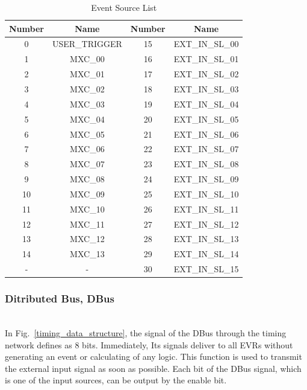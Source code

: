 \documentclass[journal]{IEEEtran}
\begin{document}
\begin{table}[h!t]
	\centering
	\caption{Event Source List}
	\label{event_tri_list}
	
	\begin{tabular}{@{}c|c|c|c@{}}
		\hline
		\textbf{Number}	& \textbf{Name}			& \textbf{Number}		& \textbf{Name}\\
		\hline
		0				& USER\_TRIGGER			& 15					& EXT\_IN\_SL\_00\\
		1				& MXC\_00				& 16					& EXT\_IN\_SL\_01\\
		2				& MXC\_01				& 17					& EXT\_IN\_SL\_02\\
		3				& MXC\_02				& 18					& EXT\_IN\_SL\_03\\
		4				& MXC\_03				& 19					& EXT\_IN\_SL\_04\\
		5				& MXC\_04				& 20					& EXT\_IN\_SL\_05\\
		6				& MXC\_05				& 21					& EXT\_IN\_SL\_06\\
		7				& MXC\_06				& 22					& EXT\_IN\_SL\_07\\
		8				& MXC\_07				& 23					& EXT\_IN\_SL\_08\\
		9				& MXC\_08				& 24					& EXT\_IN\_SL\_09\\
		10				& MXC\_09				& 25					& EXT\_IN\_SL\_10\\
		11				& MXC\_10				& 26					& EXT\_IN\_SL\_11\\
		12				& MXC\_11				& 27					& EXT\_IN\_SL\_12\\
		13				& MXC\_12				& 28					& EXT\_IN\_SL\_13\\
		14				& MXC\_13				& 29					& EXT\_IN\_SL\_14\\
		-				& -						& 30					& EXT\_IN\_SL\_15\\
		\hline
	\end{tabular}
\end{table}

\subsubsection{Ditributed Bus, DBus}\hspace*{\fill} \\
In Fig.~\ref{timing_data_structure}, the signal of the DBus through the timing network defines as 8 bits. Immediately, Its signals deliver to all EVRs without generating an event or calculating of any logic. This function is used to transmit the external input signal as soon as possible. Each bit of the DBus signal, which is one of the input sources, can be output by the enable bit.\newline
\end{document}
